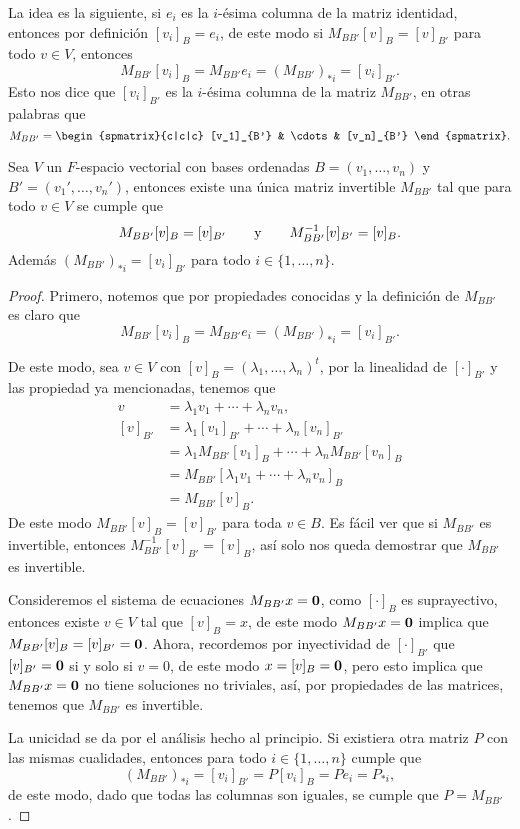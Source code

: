 La idea es la siguiente, si $e_i$ es la $i$-ésima columna de la matriz identidad, entonces por definición $[v_i]_B = e_i$, de este modo si $M_{BB'} [v]_B = [v]_{B'}$ para todo $v \in V$, entonces
  \[ M_{BB'} [v_i]_B = M_{BB'} e_i = (M_{BB'})_{*i} = [v_i]_{B'}. \]
Esto nos dice que $[v_i]_{B'}$ es la $i$-ésima columna de la matriz $M_{BB'}$, en otras palabras que
  \[ M_{BB'} = \begin{spmatrix}{c|c|c}  [v_1]_{B'} & \cdots & [v_n]_{B'}  \end{spmatrix}. \]

\begin{teor} \label{teor:CambioBase}
  Sea $V$ un $F$-espacio vectorial con bases ordenadas $B = (v_1,\ldots,v_n)$ y $B' = (v_1',\ldots,v_n')$, entonces existe una única matriz invertible $M_{BB'}$ tal que para todo $v \in V$ se cumple que
    \[ M_{BB'}[v]_B = [v]_{B'} \qquad\text{y}\qquad M_{BB'}^{-1}[v]_{B'} = [v]_B. \]
  Además $(M_{BB'})_{*i} = [v_i]_{B'}$ para todo $i \in \{1,\ldots,n\}$.
\end{teor}
\begin{proof}
  Primero, notemos que por propiedades conocidas y la definición de $M_{BB'}$ es claro que 
    \[ M_{BB'}[v_i]_B = M_{BB'} e_i =  (M_{BB'})_{*i} = [v_i]_{B'}. \]

  De este modo, sea $v \in V$ con $[v]_B = (\lambda_1,\ldots,\lambda_n)^t$, por la linealidad de $[\cdot]_{B'}$ y las propiedad ya mencionadas, tenemos que
    \begin{align*}
      v        &= \lambda_1 v_1 + \cdots + \lambda_n v_n, \\
      [v]_{B'} &= \lambda_1 [v_1]_{B'} + \cdots + \lambda_n [v_n]_{B'} \\
               &= \lambda_1 M_{BB'}[v_1]_B + \cdots + \lambda_n M_{BB'}[v_n]_B \\
               &= M_{BB'} [\lambda_1 v_1 + \cdots + \lambda_n v_n ]_B \\
               &= M_{BB'} [ v ]_B.
    \end{align*}
  De este modo $M_{BB'}[v]_B = [v]_{B'}$ para toda $v \in B$. Es fácil ver que si $M_{BB'}$ es invertible, entonces $M_{BB'}^{-1}[v]_{B'} = [v]_B$, así solo nos queda demostrar que $M_{BB'}$ es invertible.
  
  Consideremos el sistema de ecuaciones $M_{BB'}x = \mathbf{0}$, como $[\cdot]_B$ es suprayectivo, entonces existe $v \in V$ tal que $[v]_B = x$, de este modo $M_{BB'}x = \mathbf{0}$ implica que $M_{BB'}[v]_B = [v]_{B'} = \mathbf{0}$. Ahora, recordemos por inyectividad de $[\cdot]_{B'}$ que $[v]_{B'} = \mathbf{0}$ si y solo si $v = 0$, de este modo $x = [v]_{B} = \mathbf{0}$, pero esto implica que $M_{BB'}x = \mathbf{0}$ no tiene soluciones no triviales, así, por propiedades de las matrices, tenemos que $M_{BB'}$ es invertible.

  La unicidad se da por el análisis hecho al principio. Si existiera otra matriz $P$ con las mismas cualidades, entonces para todo $i \in \{1,\ldots, n\}$ cumple que
  \[ (M_{BB'})_{*i} = [v_i]_{B'} = P[v_i]_{B} = Pe_i = P_{*i},\]
  de este modo, dado que todas las columnas son iguales, se cumple que $P = M_{BB'}$.
\end{proof}

